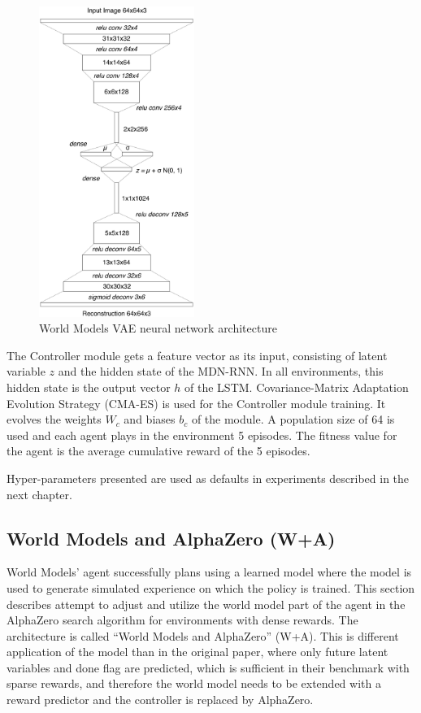 \begin{figure}[H]
\includegraphics[width=0.45\textwidth,keepaspectratio]{figures/WorldModels/world_models_vae_architecture.png}
\caption{World Models VAE neural network architecture \cite{Algo.WorldModels}}
\label{Fig.WorldModelsVAEArchitecture}
\end{figure}

The Controller module gets a feature vector as its input, consisting of latent variable $z$ and the hidden state of the MDN-RNN. In all environments, this hidden state is the output vector $h$ of the LSTM. Covariance-Matrix Adaptation Evolution Strategy (CMA-ES) \cite{Algo.CMAES} is used for the Controller module training. It evolves the weights $W_c$ and biases $b_c$ of the module. A population size of 64 is used and each agent plays in the environment 5 episodes. The fitness value for the agent is the average cumulative reward of the 5 episodes.

Hyper-parameters presented are used as defaults in experiments described in the next chapter.

\subsection{World Models and AlphaZero (W+A)}

World Models' agent \cite{Algo.WorldModels} successfully plans using a learned model where the model is used to generate simulated experience on which the policy is trained. This section describes attempt to adjust and utilize the world model part of the agent in the AlphaZero \cite{Algo.AlphaZero} search algorithm for environments with dense rewards. The architecture is called ``World Models and AlphaZero'' (W+A). This is different application of the model than in the original paper, where only future latent variables and done flag are predicted, which is sufficient in their benchmark with sparse rewards, and therefore the world model needs to be extended with a reward predictor and the controller is replaced by AlphaZero.

